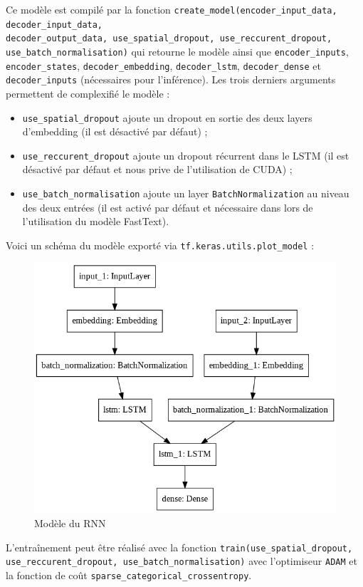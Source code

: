 \documentclass[10pt,a4paper]{article}
\begin{document}
Ce modèle est compilé par la fonction \texttt{create\_model(encoder\_input\_data, decoder\_input\_data, \\ decoder\_output\_data, use\_spatial\_dropout, use\_reccurent\_dropout, use\_batch\_normalisation)} qui retourne le modèle ainsi que \texttt{encoder\_inputs}, \texttt{encoder\_states}, \texttt{decoder\_embedding}, \texttt{decoder\_lstm}, \texttt{decoder\_dense} et \texttt{decoder\_inputs} (nécessaires pour l'inférence). Les trois derniers arguments permettent de complexifié le modèle :
\begin{itemize}
\item \texttt{use\_spatial\_dropout} ajoute un dropout en sortie des deux layers d'embedding (il est désactivé par défaut) ;
\item \texttt{use\_reccurent\_dropout} ajoute un dropout récurrent dans le LSTM (il est désactivé par défaut et nous prive de l'utilisation de CUDA) ; 
\item \texttt{use\_batch\_normalisation} ajoute un layer \texttt{BatchNormalization} au niveau des deux entrées (il est activé par défaut et nécessaire dans lors de l'utilisation du modèle FastText).
\end{itemize}
Voici un schéma du modèle exporté via \texttt{tf.keras.utils.plot\_model} :
\begin{figure}
\centering
\includegraphics[scale=0.5]{model.png}
\caption{Modèle du RNN}
\end{figure}
L'entraînement peut être réalisé avec la fonction \texttt{train(use\_spatial\_dropout, use\_reccurent\_dropout, use\_batch\_normalisation)} avec l'optimiseur \texttt{ADAM} et la fonction de coût \texttt{sparse\_categorical\_crossentropy}.
\end{document}
